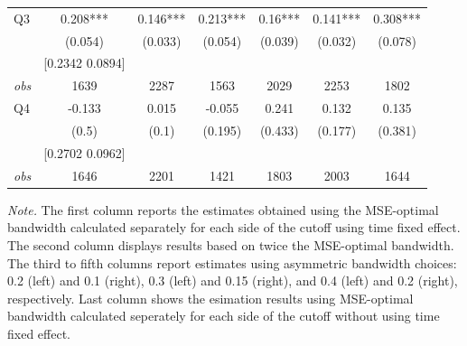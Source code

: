 \begin{table}[]
{\begin{tabular}{lcccccc}
Q3 & 0.208*** & 0.146*** & 0.213*** & 0.16*** & 0.141*** & 0.308*** \\ 
&(0.054)&(0.033) & (0.054)&(0.039)&(0.032)&(0.078)\\ 
& [0.2342 0.0894] & & & & & \\ 
\textit{obs} & 1639 & 2287 & 1563 & 2029 & 2253 & 1802 \\ 
Q4 & -0.133 & 0.015 & -0.055 & 0.241 & 0.132 & 0.135 \\ 
&(0.5)&(0.1) & (0.195)&(0.433)&(0.177)&(0.381)\\ 
& [0.2702 0.0962] & & & & & \\ 
\textit{obs} & 1646 & 2201 & 1421 & 1803 & 2003 & 1644 \\ 
\hline 
 \end{tabular}}{\textit{Note.} The first column reports the estimates obtained using the MSE-optimal bandwidth calculated separately for each side of the cutoff using time fixed effect. The second column displays results based on twice the MSE-optimal bandwidth. The third to fifth columns report estimates using asymmetric bandwidth choices: 0.2 (left) and 0.1 (right), 0.3 (left) and 0.15 (right), and 0.4 (left) and 0.2 (right), respectively. Last column shows the esimation results using MSE-optimal bandwidth calculated seperately for each side of the cutoff without using time fixed effect.}
\end{table}
